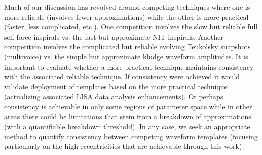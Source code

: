 \documentclass[aps,prd,twocolumn,showpacs,notitlepage,eqsecnum,
superscriptaddress,nofootinbib]{revtex4-1}
\begin{document}
Much of our discussion has revolved around competing techniques where one is more reliable (involves fewer approximations) while the other is more practical (faster, less complicated, etc.). One competition involves the slow but reliable full self-force inspirals vs. the fast but approximate NIT inspirals. Another competition involves the complicated but reliable evolving Teukolsky snapshots (multivoice) vs. the simple but approximate kludge waveform amplitudes. It is important to evaluate whether a more practical technique maintains consistency with the associated reliable technique. If consistency were achieved it would validate deployment of templates based on the more practical technique (actualizing associated LISA data analysis enhancements). Or perhaps consistency is achievable in only some regions of parameter space while in other areas there could be limitations that stem from a breakdown of approximations (with a quantifiable breakdown threshold). In any case, we seek an appropriate method to quantify consistency between competing waveform templates (focusing particularly on the high eccentricities that are achievable through this work).
\end{document}
